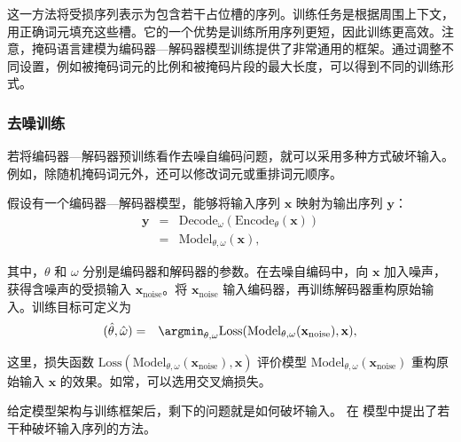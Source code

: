 这一方法将受损序列表示为包含若干占位槽的序列。训练任务是根据周围上下文，用正确词元填充这些槽。它的一个优势是训练所用序列更短，因此训练更高效。注意，掩码语言建模为编码器—解码器模型训练提供了非常通用的框架。通过调整不同设置，例如被掩码词元的比例和被掩码片段的最大长度，可以得到不同的训练形式。

\subsubsection{去噪训练}

\noindent 若将编码器—解码器预训练看作去噪自编码问题，就可以采用多种方式破坏输入。例如，除随机掩码词元外，还可以修改词元或重排词元顺序。

假设有一个编码器—解码器模型，能够将输入序列 $\mathbf{x}$ 映射为输出序列 $\mathbf{y}$：
\begin{eqnarray}
\mathbf{y} & = & \mathrm{Decode}_{\omega}(\mathrm{Encode}_{\theta}(\mathbf{x})) \nonumber \\
           & = & \mathrm{Model}_{\theta,\omega}(\mathbf{x}),
\end{eqnarray}

\noindent 其中，$\theta$ 和 $\omega$ 分别是编码器和解码器的参数。在去噪自编码中，向 $\mathbf{x}$ 加入噪声，获得含噪声的受损输入 $\mathbf{x}_{\mathrm{noise}}$。将 $\mathbf{x}_{\mathrm{noise}}$ 输入编码器，再训练解码器重构原始输入。训练目标可定义为
\begin{eqnarray}
(\hat{\theta},\hat{\omega}) & = & \argmin_{\theta,\omega} \mathrm{Loss}(\mathrm{Model}_{\theta,\omega}(\mathbf{x}_{\mathrm{noise}}),\mathbf{x}),
\end{eqnarray}

\noindent 这里，损失函数 $\mathrm{Loss}(\mathrm{Model}_{\theta,\omega}(\mathbf{x}_{\mathrm{noise}}),\mathbf{x})$ 评价模型 $\mathrm{Model}_{\theta,\omega}(\mathbf{x}_{\mathrm{noise}})$ 重构原始输入 $\mathbf{x}$ 的效果。如常，可以选用交叉熵损失。

给定模型架构与训练框架后，剩下的问题就是如何破坏输入。\citet{lewis-etal:2020bart} 在  模型中提出了若干种破坏输入序列的方法。

